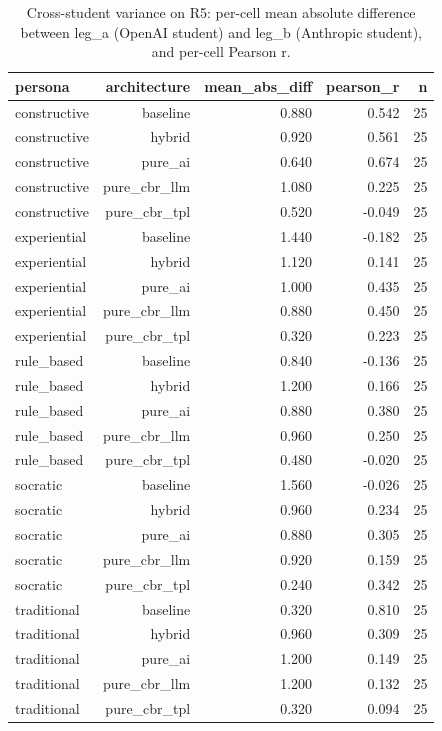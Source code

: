 \begin{table}[htbp]
\centering
\caption{Cross-student variance on R5: per-cell mean absolute difference between leg\_a (OpenAI student) and leg\_b (Anthropic student), and per-cell Pearson r.}
\label{tab:cross-student}
\begin{tabular}{lrrrr}
\toprule
persona & architecture & mean\_abs\_diff & pearson\_r & n \\
\midrule
constructive & baseline & 0.880 & 0.542 & 25 \\
constructive & hybrid & 0.920 & 0.561 & 25 \\
constructive & pure\_ai & 0.640 & 0.674 & 25 \\
constructive & pure\_cbr\_llm & 1.080 & 0.225 & 25 \\
constructive & pure\_cbr\_tpl & 0.520 & -0.049 & 25 \\
experiential & baseline & 1.440 & -0.182 & 25 \\
experiential & hybrid & 1.120 & 0.141 & 25 \\
experiential & pure\_ai & 1.000 & 0.435 & 25 \\
experiential & pure\_cbr\_llm & 0.880 & 0.450 & 25 \\
experiential & pure\_cbr\_tpl & 0.320 & 0.223 & 25 \\
rule\_based & baseline & 0.840 & -0.136 & 25 \\
rule\_based & hybrid & 1.200 & 0.166 & 25 \\
rule\_based & pure\_ai & 0.880 & 0.380 & 25 \\
rule\_based & pure\_cbr\_llm & 0.960 & 0.250 & 25 \\
rule\_based & pure\_cbr\_tpl & 0.480 & -0.020 & 25 \\
socratic & baseline & 1.560 & -0.026 & 25 \\
socratic & hybrid & 0.960 & 0.234 & 25 \\
socratic & pure\_ai & 0.880 & 0.305 & 25 \\
socratic & pure\_cbr\_llm & 0.920 & 0.159 & 25 \\
socratic & pure\_cbr\_tpl & 0.240 & 0.342 & 25 \\
traditional & baseline & 0.320 & 0.810 & 25 \\
traditional & hybrid & 0.960 & 0.309 & 25 \\
traditional & pure\_ai & 1.200 & 0.149 & 25 \\
traditional & pure\_cbr\_llm & 1.200 & 0.132 & 25 \\
traditional & pure\_cbr\_tpl & 0.320 & 0.094 & 25 \\
\bottomrule
\end{tabular}
\end{table}
